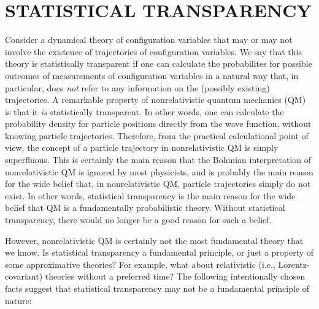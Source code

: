 \documentclass[12pt]{article}
\begin{document}
\section{STATISTICAL TRANSPARENCY}
\label{secST}

Consider a dynamical theory of configuration variables 
that may or may not involve the existence 
of trajectories of configuration
variables. We say that this theory 
is statistically transparent 
if one can calculate the probabilites for possible outcomes 
of measurements of configuration variables in a natural 
way that, in particular, does {\em not} 
refer to any information on the
(possibly existing) trajectories. 
A remarkable property of nonrelativistic 
quantum mechanics (QM) 
is that it {\em is} statistically transparent. 
In other words, one can calculate 
the probability density for particle positions directly from the 
wave function, without knowing particle trajectories. 
Therefore, from the practical calculational point of view, 
the concept of a particle trajectory in nonrelativistic QM 
is simply superfluous. 
This is certainly the main reason 
that the Bohmian interpretation of 
nonrelativistic QM is ignored by most physicists,
and is probably the main reason for
the wide belief that, in nonrelativistic QM, 
particle trajectories simply do not exist.
In other words, statistical transparency is the main reason 
for the wide belief that QM is a fundamentally probabilistic 
theory. Without statistical transparency, there would 
no longer be a good reason for such a belief. 

However, nonrelativistic QM is certainly not the most fundamental 
theory that we know. Is statistical transparency a fundamental 
principle, or just a property of some approximative 
theories? For example, what about relativistic (i.e., Lorentz-covariant)
theories without a preferred time? The following intentionally 
chosen facts suggest that statistical transparency may not be 
a fundamental principle of nature:
\end{document}
